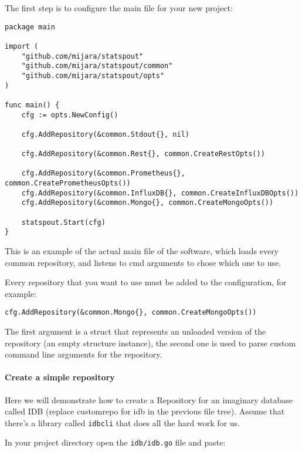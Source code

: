 The first step is to configure the main file for your new project:

\begin{lstlisting}[language=Golang]
package main

import (
	"github.com/mijara/statspout"
	"github.com/mijara/statspout/common"
	"github.com/mijara/statspout/opts"
)

func main() {
	cfg := opts.NewConfig()

	cfg.AddRepository(&common.Stdout{}, nil)

	cfg.AddRepository(&common.Rest{}, common.CreateRestOpts())

	cfg.AddRepository(&common.Prometheus{}, common.CreatePrometheusOpts())
	cfg.AddRepository(&common.InfluxDB{}, common.CreateInfluxDBOpts())
	cfg.AddRepository(&common.Mongo{}, common.CreateMongoOpts())

	statspout.Start(cfg)
}
\end{lstlisting}

This is an example of the actual main file of the software, which loads every common repository, and listens to cmd arguments to chose which one to use.

Every repository that you want to use must be added to the configuration, for example:

\begin{lstlisting}[language=Golang]
cfg.AddRepository(&common.Mongo{}, common.CreateMongoOpts())
\end{lstlisting}

The first argument is a struct that represents an unloaded version of the repository (an empty structure instance), the second one is used to parse custom command line arguments for the repository.

\paragraph{Create a simple repository}

Here we will demonstrate how to create a Repository for an imaginary database called IDB (replace customrepo for idb in the previous file tree). Assume that there's a library called \texttt{idbcli} that does all the hard work for us.

In your project directory open the \texttt{idb/idb.go} file and paste:


